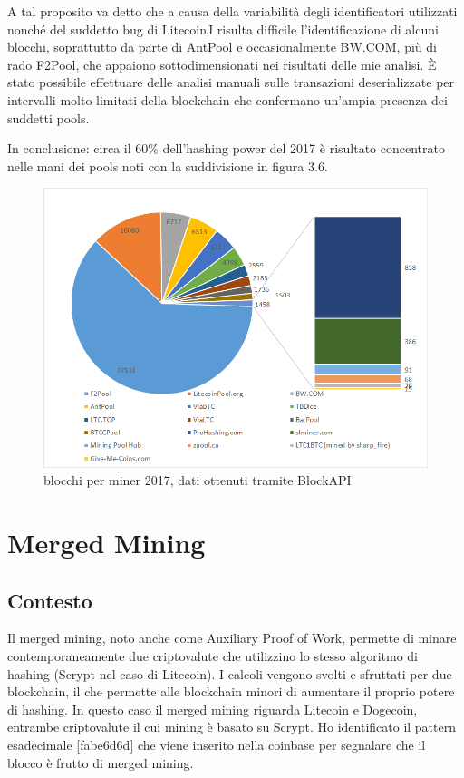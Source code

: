 A tal proposito va detto che a causa della variabilità degli identificatori utilizzati nonché del suddetto bug di LitecoinJ risulta difficile l’identificazione di alcuni blocchi, soprattutto da parte di AntPool e occasionalmente BW.COM, più di rado F2Pool, che appaiono sottodimensionati nei risultati delle mie analisi. È stato possibile effettuare delle analisi manuali sulle transazioni deserializzate per intervalli molto limitati della blockchain che confermano un’ampia presenza dei suddetti pools.

In conclusione: circa il 60\% dell’hashing power del 2017 è risultato concentrato nelle mani dei pools noti con la suddivisione in figura 3.6.

\begin{figure}[h!]
	\centering
	\includegraphics[width=1.0\linewidth]{images/distribuzionemining}
	\caption{blocchi per miner 2017, dati ottenuti tramite BlockAPI}
	\label{fig:distribuzionemining}
\end{figure}


\section{Merged Mining}
\subsection{Contesto}
Il merged mining, noto anche come Auxiliary Proof of Work, permette di minare contemporaneamente due criptovalute che utilizzino lo stesso algoritmo di hashing (Scrypt nel caso di Litecoin).
I calcoli vengono svolti e sfruttati per due blockchain, il che permette alle blockchain minori di aumentare il proprio potere di hashing. In questo caso il merged mining riguarda Litecoin e Dogecoin, entrambe criptovalute il cui mining è basato su Scrypt.
Ho identificato il pattern esadecimale [fabe6d6d] che viene inserito nella coinbase per segnalare che il blocco è frutto di merged mining.

